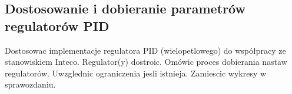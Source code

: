 \subsection{Dostosowanie i dobieranie parametrów regulatorów PID}
\label{lab:zad10}



\ifdefined\CompileFigures
%    
\fi

Dostosowac implementacje regulatora PID (wielopetlowego) do współpracy ze stanowiskiem
Inteco. Regulator(y) dostroic. Omówic proces dobierania nastaw regulatorów.
Uwzglednic ograniczenia jesli istnieja. Zamiescic wykresy w sprawozdaniu.

\newpage
